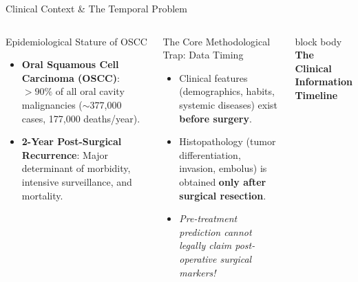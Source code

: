 \documentclass[10pt,aspectratio=169,xcolor={table,dvipsnames}]{beamer}
\begin{document}
\begin{frame}{Clinical Context \& The Temporal Problem}
  \begin{columns}[c]
      \begin{block}{Epidemiological Stature of OSCC}
        \begin{itemize}\setlength{\itemsep}{3pt}
          \item \textbf{Oral Squamous Cell Carcinoma (OSCC)}: $>90\%$ of all oral cavity malignancies ($\sim$377,000 cases, 177,000 deaths/year).
          \item \textbf{2-Year Post-Surgical Recurrence}: Major determinant of morbidity, intensive surveillance, and mortality.
        \end{itemize}
      \end{block}

      \begin{alertblock}{The Core Methodological Trap: Data Timing}
        \begin{itemize}\setlength{\itemsep}{2pt}
          \item Clinical features (demographics, habits, systemic diseases) exist \textbf{before surgery}.
          \item Histopathology (tumor differentiation, invasion, embolus) is obtained \textbf{only after surgical resection}.
          \item \textit{Pre-treatment prediction cannot legally claim post-operative surgical markers!}
        \end{itemize}
      \end{alertblock}

      \centering
      \begin{beamercolorbox}[sep=8pt,rounded=true,center]{block body}
        \textbf{\footnotesize The Clinical Information Timeline}\\[0.3cm]
\end{beamercolorbox}
\end{columns}
\end{frame}
\end{document}
